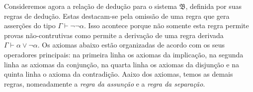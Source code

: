 \vspace{.5\baselineskip}
    Consideremos agora a relação de dedução para o sistema $\mathfrak{B}$, definida por suas regras de dedução.
    Estas destacam-se pela omissão de uma regra que gera asserções do tipo $\Gamma\vdash\neg\neg\alpha$.
    Isso acontece porque não somente esta regra permite provas não-contrutivas como permite a derivação de uma regra derivada $\Gamma\vdash\alpha\vee\neg\alpha$.
    Os axiomas abaixo estão organizadas de acordo com os seus operadores principais: na primeira linha os axiomas da implicação, na segunda linha as axiomas da conjunção, na quarta linha os axiomas da disjunção e na quinta linha o axioma da contradição.
    Aaixo dos axiomas, temos as demais regras, nomeadamente a \emph{regra da assunção} e a \emph{regra da separação}.

\vspace{\baselineskip}
